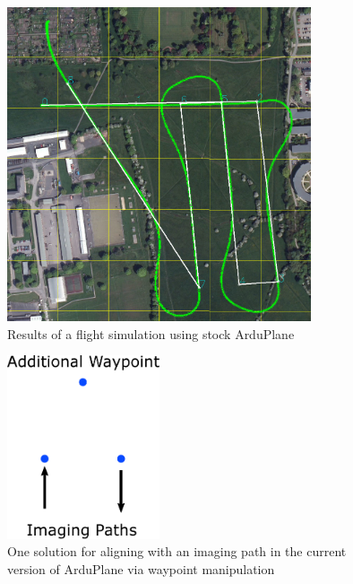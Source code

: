 \begin{figure}[htbp!] 
\centering    
\includegraphics[width=0.8\textwidth]{BaseArduPlane}
\caption[Stock ArduPlane path tracking]{Results of a flight simulation using stock ArduPlane}
\label{fig:baseArduPlane}
\end{figure}

\begin{figure}[htbp!] 
\centering    
\includegraphics[width=0.4\textwidth]{WaypointManipulation}
\caption[Aligning with an imaging path in stock ArduPlane]{One solution for aligning with an imaging path in the current version of ArduPlane via waypoint manipulation}
\label{fig:waypoingmanipulation}
\end{figure}

